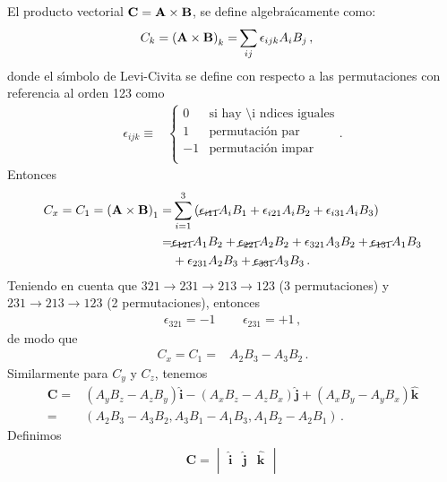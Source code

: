 \begin{frame}
El producto vectorial $\mathbf{C}=\mathbf{A}\times\mathbf{B}$, se define algebra\'\i camente como:
\begin{align}
  C_k=\left(\mathbf{A}\times\mathbf{B}\right)_k=&\sum_{ij}\epsilon_{ijk}A_iB_j\,,
\end{align}
donde el s\'\i mbolo de Levi-Civita se define con respecto a las
permutaciones con referencia al orden 123 como
\begin{align}
  \epsilon_{ijk}\equiv& \begin{cases}
    0&\text{si hay \'\i ndices iguales}\\
    1&\text{permutaci\'on par}\\
    -1&\text{permutaci\'on impar}\\
  \end{cases}.
\end{align}
Entonces
\begin{align}
  C_x=C_1=\left(\mathbf{A}\times\mathbf{B}\right)_1=&
\sum_{i=1}^3\left(\cancel{\epsilon_{i11}}A_iB_1+\epsilon_{i21}A_iB_2+\epsilon_{i31}A_iB_3\right)\nonumber\\
=&\cancel{\epsilon_{121}}A_1B_2+\cancel{\epsilon_{221}}A_2B_2
+\epsilon_{321}A_3B_2+\cancel{\epsilon_{131}}A_1B_3\nonumber\\
&+\epsilon_{231}A_2B_3+\cancel{\epsilon_{331}}A_3B_3\,.
\end{align}
Teniendo en cuenta que $321\to231\to213\to123$ (3 permutaciones) y
$231\to213\to123$ (2 permutaciones), entonces
\begin{align}
  \epsilon_{321}=-1\,\qquad \epsilon_{231}=+1\,,
\end{align}
de modo que
\begin{align}
  C_x=C_1=&A_2B_3-A_3B_2\,.
\end{align}
Similarmente para $C_y$ y $C_z$, tenemos
\begin{align}
  \label{eq:crossprod}
  \mathbf{C}=&\left(A_yB_z-A_zB_y\right)\hat{\mathbf{i}}
-\left(A_xB_z-A_zB_x\right)\hat{\mathbf{j}}
+\left(A_xB_y-A_yB_x\right)\hat{\mathbf{k}}\nonumber\\
 =&\left(A_2B_3-A_3B_2,A_3B_1-A_1B_3,A_1B_2-A_2B_1\right)
\,.
\end{align}
Definimos
\begin{align}
  \label{eq:det}
  \mathbf{C}=\begin{vmatrix}
    \hat{\mathbf{i}} & \hat{\mathbf{j}} & \hat{\mathbf{k}}\\

\end{vmatrix}
\end{align}
\end{frame}

